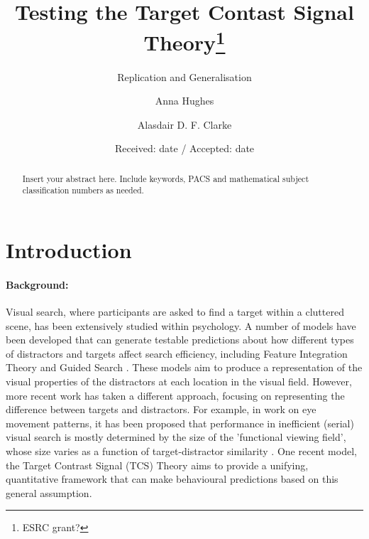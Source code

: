 \documentclass[smallextended]{svjour3}       %
\begin{document}
\title{Testing the Target Contast Signal Theory\thanks{ESRC grant?}
}
\subtitle{Replication and Generalisation}


\author{Anna Hughes \and Alasdair D. F. Clarke
}



\date{Received: date / Accepted: date}

\maketitle

\begin{abstract}
Insert your abstract here. Include keywords, PACS and mathematical
subject classification numbers as needed.
\end{abstract}

\section{Introduction}
\label{intro}

\paragraph{Background:}
Visual search, where participants are asked to find a target within a cluttered scene, has been extensively studied within psychology. A number of models have been developed that can generate testable predictions about how different types of distractors and targets affect search efficiency, including Feature Integration Theory \cite{treisman1980feature} and Guided Search \cite{wolfe1989guided,wolfe2014approaches}. These models aim to produce a representation of the visual properties of the distractors at each location in the visual field. However, more recent work has taken a different approach, focusing on representing the difference between targets and distractors. For example, in work on eye movement patterns, it has been proposed that performance in inefficient (serial) visual search is mostly determined by the size of the 'functional viewing field', whose size varies as a function of target-distractor similarity \cite{hulleman2017brink}. One recent model, the Target Contrast Signal (TCS) Theory \cite{lleras2020target} aims to provide a unifying, quantitative framework that can make behavioural predictions based on this general assumption.
\end{document}
